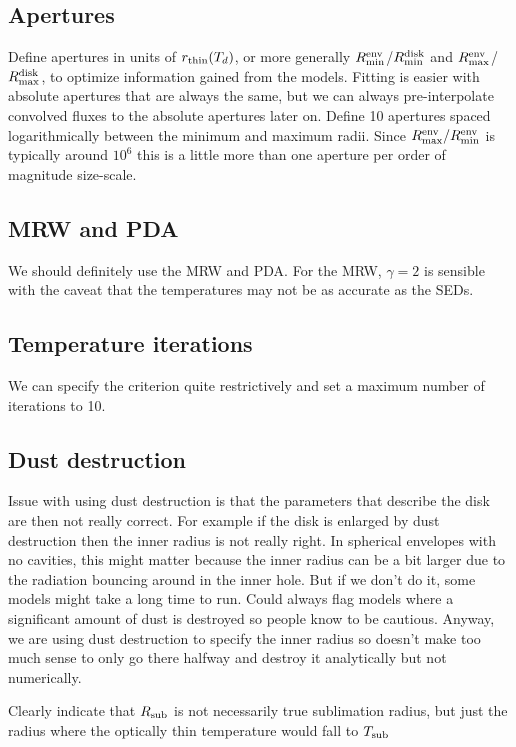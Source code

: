 \documentclass[10pt]{article}
\newcommand{\rmind}{R^{\rm disk}_{\rm min}}
\newcommand{\rmaxd}{R^{\rm disk}_{\rm max}}
\newcommand{\rmine}{R^{\rm env}_{\rm min}}
\newcommand{\rmaxe}{R^{\rm env}_{\rm max}}
\begin{document}
\subsection{Apertures}

Define apertures in units of $r_{\rm thin}(T_d)$, or more generally $\rmine$/$\rmind$ and $\rmaxe$/$\rmaxd$, to optimize information gained from the models. Fitting is easier with absolute apertures that are always the same, but we can always pre-interpolate convolved fluxes to the absolute apertures later on. Define 10 apertures spaced logarithmically between the minimum and maximum radii. Since $\rmaxe/\rmine$ is typically around $10^6$ this is a little more than one aperture per order of magnitude size-scale.

\subsection{MRW and PDA}

We should definitely use the MRW and PDA. For the MRW, $\gamma=2$ is sensible with the caveat that the temperatures may not be as accurate as the SEDs.

\subsection{Temperature iterations}

We can specify the criterion quite restrictively and set a maximum number of iterations to 10.

\subsection{Dust destruction}

Issue with using dust destruction is that the parameters that describe the disk are then not really correct. For example if the disk is enlarged by dust destruction then the inner radius is not really right. In spherical envelopes with no cavities, this might matter because the inner radius can be a bit larger due to the radiation bouncing around in the inner hole. But if we don't do it, some models might take a long time to run. Could always flag models where a significant amount of dust is destroyed so people know to be cautious. Anyway, we are using dust destruction to specify the inner radius so doesn't make too much sense to only go there halfway and destroy it analytically but not numerically.

Clearly indicate that $R_{\rm sub}$ is not necessarily true sublimation radius, but just the radius where the optically thin temperature would fall to $T_{\rm sub}$
\end{document}
